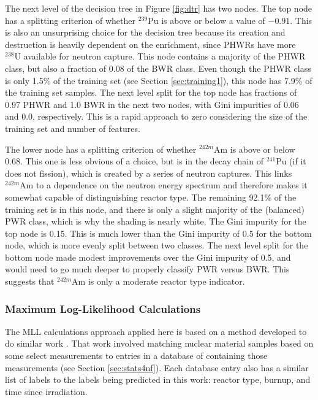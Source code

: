 The next level of the decision tree in Figure \ref{fig:dtr} has two nodes. The
top node has a splitting criterion of whether ${}^{239}\text{Pu}$ is above or
below a value of $-0.91$.  This is also an unsurprising choice for the decision
tree because its creation and destruction is heavily dependent on the enrichment,
since \glspl{PHWR} have more ${}^{238}\text{U}$ available for neutron capture.
This node contains a majority of the \gls{PHWR} class, but also a fraction of
0.08 of the \gls{BWR} class.  Even though the \gls{PHWR} class is only 1.5\% of
the training set (see Section \ref{sec:training1}), this node has 7.9\% of the
training set samples.  The next level split for the top node has fractions of
0.97 \gls{PHWR} and 1.0 \gls{BWR} in the next two nodes, with Gini impurities
of 0.06 and 0.0, respectively. This is a rapid approach to zero considering the
size of the training set and number of features. 

The lower node has a splitting criterion of whether ${}^{242m}\text{Am}$ is
above or below 0.68.  This one is less obvious of a choice, but is in the decay
chain of ${}^{241}\text{Pu}$ (if it does not fission), which is created by a
series of neutron captures.  This links ${}^{242m}\text{Am}$ to a dependence on
the neutron energy spectrum and therefore makes it somewhat capable of
distinguishing reactor type.  The remaining 92.1\% of the training set is in
this node, and there is only a slight majority of the (balanced) \gls{PWR}
class, which is why the shading is nearly white. The Gini impurity for the top
node is 0.15.  This is much lower than the Gini impurity of 0.5 for the bottom
node, which is more evenly split between two classes.  The next level split for
the bottom node made modest improvements over the Gini impurity of 0.5, and
would need to go much deeper to properly classify \gls{PWR} versus \gls{BWR}.
This suggests that ${}^{242m}\text{Am}$ is only a moderate reactor type
indicator.

\subsubsection{Maximum Log-Likelihood Calculations}

The \gls{MLL} calculations approach applied here is based on a method developed
to do similar work \cite{mll_method, mll_validate, mll_sensitivity}.  That work
involved matching nuclear material samples based on some select measurements to
entries in a database of containing those measurements (see Section
\ref{sec:stats4nf}).  Each database entry also has a similar list of labels to
the labels being predicted in this work: reactor type, burnup, and time since
irradiation.


